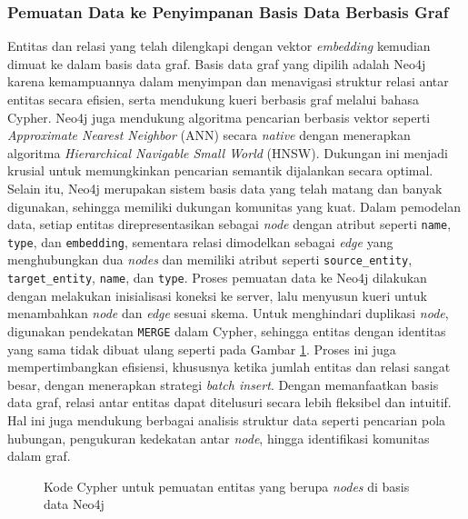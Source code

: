\subsubsection{Pemuatan Data ke Penyimpanan Basis Data Berbasis Graf}
Entitas dan relasi yang telah dilengkapi dengan vektor \textit{embedding} kemudian dimuat ke dalam basis data graf.
Basis data graf yang dipilih adalah Neo4j karena kemampuannya dalam menyimpan dan menavigasi struktur relasi antar entitas secara efisien, serta mendukung kueri berbasis graf melalui bahasa Cypher.
Neo4j juga mendukung algoritma pencarian berbasis vektor seperti \textit{Approximate Nearest Neighbor} (ANN) secara \textit{native} dengan menerapkan algoritma \textit{Hierarchical Navigable Small World} (HNSW).
Dukungan ini menjadi krusial untuk memungkinkan pencarian semantik dijalankan secara optimal.
Selain itu, Neo4j merupakan sistem basis data yang telah matang dan banyak digunakan, sehingga memiliki dukungan komunitas yang kuat. Dalam pemodelan data, setiap entitas direpresentasikan sebagai \textit{node} dengan atribut seperti \texttt{name}, \texttt{type}, dan \texttt{embedding}, sementara relasi dimodelkan sebagai \textit{edge} yang menghubungkan dua \textit{nodes} dan memiliki atribut seperti \texttt{source\_entity}, \texttt{target\_entity}, \texttt{name}, dan \texttt{type}.
Proses pemuatan data ke Neo4j dilakukan dengan melakukan inisialisasi koneksi ke server, lalu menyusun kueri untuk menambahkan \textit{node} dan \textit{edge} sesuai skema.
Untuk menghindari duplikasi \textit{node}, digunakan pendekatan \texttt{MERGE} dalam Cypher, sehingga entitas dengan identitas yang sama tidak dibuat ulang seperti pada Gambar \ref{fig:cypher-insert-entities}.
Proses ini juga mempertimbangkan efisiensi, khususnya ketika jumlah entitas dan relasi sangat besar, dengan menerapkan strategi \textit{batch insert}.
Dengan memanfaatkan basis data graf, relasi antar entitas dapat ditelusuri secara lebih fleksibel dan intuitif.
Hal ini juga mendukung berbagai analisis struktur data seperti pencarian pola hubungan, pengukuran kedekatan antar \textit{node}, hingga identifikasi komunitas dalam graf.

\begin{figure}[H]
	\centering
	\caption{
		Kode Cypher untuk pemuatan entitas yang berupa \textit{nodes} di basis data Neo4j
	}
	\label{fig:cypher-insert-entities}
\end{figure}


